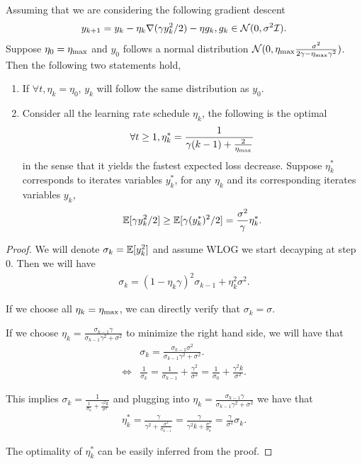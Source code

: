 \begin{lemma}
\label{lem:fast}
Assuming that we are considering the following gradient descent
\begin{align*}
    y_{k + 1} =  y_k - \eta_k \nabla (\gamma y_k^2/2) - \eta {g}_k, {g}_k \in \mathcal{N}(0, \sigma^2 \mathcal{I}).
\end{align*}
Suppose $\eta_0 = \eta_{\mathrm{max}}$ and $y_0$ follows a normal distribution $\mathcal{N}(0, \eta_{\mathrm{max}} \frac{\sigma^2}{2 \gamma - \eta_{\mathrm{max}} \gamma^2})$. Then the following two statements hold, 
\begin{enumerate}
    \item If $\forall t, \eta_k = \eta_0$, $y_k$ will follow the same distribution as $y_0$.
    \item Consider all the learning rate schedule $\eta_k$, the following is the optimal
    \begin{align*}
       \forall t \ge 1, \eta_k^* = \frac{1}{\gamma (k - 1) + \frac{2}{\eta_{\mathrm{max}}}}
    \end{align*}
    in the sense that it yields the fastest expected loss decrease. Suppose $\eta_k^*$ corresponds to iterates variables $y_k^*$, for any $\eta_k$ and its corresponding iterates variables $y_k$,
    \begin{align*}
        \mathbb{E}[\gamma y_k^2 / 2] \ge \mathbb{E}[\gamma (y_k^*)^2 / 2] = \frac{\sigma^2}{\gamma} \eta_k^*.
    \end{align*}
\end{enumerate}

\end{lemma}
\begin{proof}
We will denote $\sigma_k = \mathbb{E}[y_k^2]$ and assume WLOG we start decayping at step $0$. Then we will have
\begin{align*}
    \sigma_k = (1 - \eta_k \gamma)^2 \sigma_{k - 1} + \eta_k^2 \sigma^2.
\end{align*}

If we choose all $\eta_k = \eta_{\mathrm{max}}$, we can directly verify that $\sigma_k = \sigma$.


If we choose $\eta_k = \frac{\sigma_{k - 1 }\gamma}{\sigma_{k - 1}\gamma^2 + \sigma^2}$ to minimize the right hand side, we will have that
\begin{align*}
&\sigma_k = \frac{\sigma_{k - 1} \sigma^2}{\sigma_{k- 1}\gamma^2 + \sigma^2}. \\
\iff     &\frac{1}{\sigma_k} = \frac{1}{\sigma_{k - 1}} + \frac{\gamma^2}{\sigma^2} = \frac{1}{\sigma_0} + \frac{\gamma^2 k}{\sigma^2}.
\end{align*}

This implies $\sigma_k = \frac{1}{\frac{1}{\sigma_0} + \frac{\gamma^2 k}{\sigma^2}}$ and plugging into $\eta_k = \frac{\sigma_{k - 1 }\gamma}{\sigma_{k - 1}\gamma^2 + \sigma^2}$ we have that
\begin{align*}
    \eta_k^* = \frac{\gamma}{\gamma^2 + \frac{\sigma^2}{\sigma_{k - 1}}}=  \frac{\gamma}{\gamma^2 k + \frac{\sigma^2}{\sigma_0}} = \frac{\gamma}{\sigma^2} \sigma_k.
\end{align*}


The optimality of $\eta_k^*$ can be easily inferred from the proof.
\end{proof}
